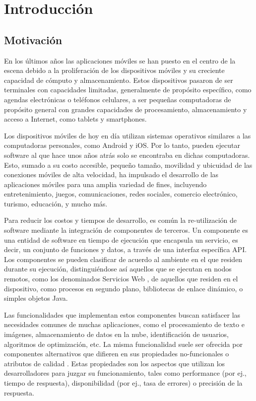 
\chapter{Introducción}


\section{Motivación\label{sec:Motivaci=0000F3n}}

En los últimos años las aplicaciones móviles se han puesto en el centro
de la escena debido a la proliferación de los dispositivos móviles
y su creciente capacidad de cómputo y almacenamiento\cite{Zunino2011}.
Estos dispositivos pasaron de ser terminales con capacidades limitadas,
generalmente de propósito específico, como agendas electrónicas o
teléfonos celulares, a ser pequeñas computadoras de propósito general
con grandes capacidades de procesamiento, almacenamiento y acceso
a Internet, como tablets y smartphones. 

Los dispositivos móviles de hoy en día utilizan sistemas operativos
similares a las computadoras personales, como Android y iOS. Por lo
tanto, pueden ejecutar software al que hace unos años atrás solo se
encontraba en dichas computadoras. Esto, sumado a su costo accesible,
pequeño tamaño, movilidad y ubicuidad de las conexiones móviles de
alta velocidad, ha impulsado el desarrollo de las aplicaciones móviles
para una amplia variedad de fines, incluyendo entretenimiento, juegos,
comunicaciones, redes sociales, comercio electrónico, turismo, educación,
y mucho más. 

Para reducir los costos y tiempos de desarrollo, es común la re-utilización
de software mediante la integración de componentes de terceros. Un
componente \citep{Petritsch2016} es una entidad de software en tiempo
de ejecución que encapsula un servicio, es decir, un conjunto de funciones
y datos, a través de una interfaz específica \ac{API}. Los componentes
se pueden clasificar de acuerdo al ambiente en el que residen durante
su ejecución, distinguiéndose así aquellos que se ejecutan en nodos
remotos, como los denominados Servicios Web \cite{Erickson2009},
de aquellos que residen en el dispositivo, como procesos en segundo
plano, bibliotecas de enlace dinámico, o simples objetos Java. 

Las funcionalidades que implementan estos componentes buscan satisfacer
las necesidades comunes de muchas aplicaciones, como el procesamiento
de texto e imágenes, almacenamiento de datos en la nube, identificación
de usuarios, algoritmos de optimización, etc. La misma funcionalidad
suele ser ofrecida por componentes alternativos que difieren en sus
propiedades no-funcionales o atributos de calidad \cite{Addison2003}.
Estas propiedades son los aspectos que utilizan los desarrolladores
para juzgar su funcionamiento, tales como performance (por ej., tiempo
de respuesta), disponibilidad (por ej., tasa de errores) o precisión
de la respuesta. 

